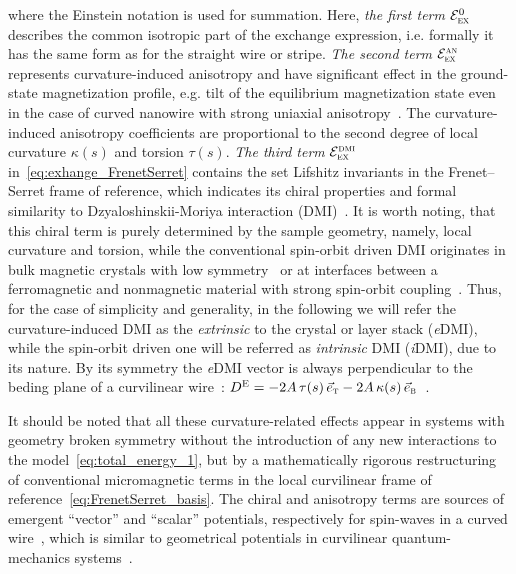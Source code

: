 \documentclass[showpacs,amsmath,amssymb,aps,pra,longbibliography,
10pt,preprint,superscriptaddress,showkeys]{revtex4-1}
\begin{document}
where the Einstein notation is used for summation. Here, \textit{the first term} $\mathcal{E}_\textsc{ex}^0$ describes the common isotropic part of the exchange expression, i.e. formally it has the same form as for the straight wire or stripe. \textit{The second term} $\mathcal{E}_\textsc{ex}^\textsc{an}$ represents curvature-induced anisotropy and have significant effect in the ground-state magnetization profile, e.g. tilt of the equilibrium magnetization state even in the case of curved nanowire with strong uniaxial anisotropy~\cite{Sheka15,Pylypovskyi16}. The curvature-induced anisotropy coefficients are proportional to the second degree of local curvature $\kappa(s)$ and torsion $\tau(s)$. \textit{The third term} $\mathcal{E}_\textsc{ex}^\textsc{dmi}$ in~\eqref{eq:exhange_FrenetSerret} contains the set Lifshitz invariants in the Frenet--Serret frame of reference, which indicates its chiral properties and formal similarity to Dzyaloshinskii-Moriya interaction (DMI)~\cite{Sheka15}. It is worth noting, that this chiral term is purely determined by the sample geometry, namely, local curvature and torsion, while the conventional spin-orbit driven DMI originates in bulk magnetic crystals with low symmetry~\cite{Dzyaloshinsky58,Moriya60a} or at interfaces between a ferromagnetic and nonmagnetic material with strong spin-orbit coupling~\cite{Fert90,Crepieux98,Bode07,Yang15}. Thus, for the case of simplicity and generality, in the following we will refer the curvature-induced DMI as the \textit{extrinsic} to the crystal or layer stack (\textit{e}DMI), while the spin-orbit driven one will be referred as \textit{intrinsic} DMI (\textit{i}DMI), due to its nature. By its symmetry the \textit{e}DMI vector is always perpendicular to the beding plane of a curvilinear wire~\cite{Sheka15}: $D^\textsc{E} = -2 A \, \tau(s) \, \vec{e}_\textsc{t} - 2 A \, \kappa(s) \, \vec{e}_\textsc{b}$~\cite{Pylypovskyi16,Volkov18}.

It should be noted that all these curvature-related effects appear in systems with geometry broken symmetry without the introduction of any new interactions to the model~\eqref{eq:total_energy_1}, but by a mathematically rigorous restructuring of conventional micromagnetic terms in the local curvilinear frame of reference~\eqref{eq:FrenetSerret_basis}. The chiral and anisotropy terms are sources of emergent ``vector'' and ``scalar'' potentials, respectively for spin-waves in a curved wire~\cite{Sheka15}, which is similar to geometrical potentials in curvilinear quantum-mechanics systems~\cite{Ortix15}.
\end{document}
